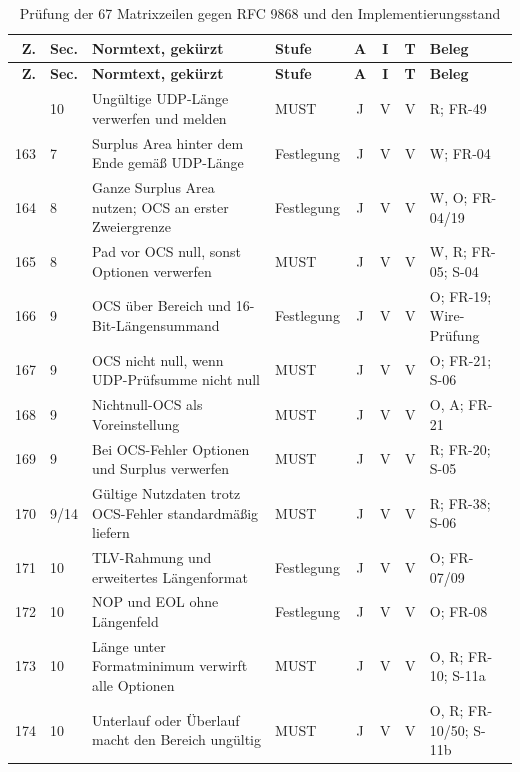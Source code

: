 \begingroup
\footnotesize
\setlength{\tabcolsep}{2pt}
\renewcommand{\arraystretch}{1.00}
\begin{longtable}{@{}r l L{4.45cm} L{2.00cm} c c c L{4.20cm}@{}}
\caption{Prüfung der 67 Matrixzeilen gegen RFC 9868 und den Implementierungsstand}
\label{tab:eval-sollist}\\
\toprule
\textbf{Z.} & \textbf{Sec.} & \textbf{Normtext, gekürzt} & \textbf{Stufe} & \textbf{A} &
\textbf{I} & \textbf{T} & \textbf{Beleg} \\
\midrule
\endfirsthead
\toprule
\textbf{Z.} & \textbf{Sec.} & \textbf{Normtext, gekürzt} & \textbf{Stufe} & \textbf{A} &
\textbf{I} & \textbf{T} & \textbf{Beleg} \\
\midrule
\endhead
\bottomrule
{} & 10 & Ungültige UDP-Länge verwerfen und melden & MUST & J & V & V & R; FR-49 \\
163 & 7 & Surplus Area hinter dem Ende gemäß UDP-Länge & Festlegung & J & V & V & W; FR-04 \\
164 & 8 & Ganze Surplus Area nutzen; OCS an erster Zweiergrenze & Festlegung & J & V & V & W, O; FR-04/19 \\
165 & 8 & Pad vor OCS null, sonst Optionen verwerfen & MUST & J & V & V & W, R; FR-05; S-04 \\
166 & 9 & OCS über Bereich und 16-Bit-Längensummand & Festlegung & J & V & V & O; FR-19; Wire-Prüfung \\
167 & 9 & OCS nicht null, wenn UDP-Prüfsumme nicht null & MUST & J & V & V & O; FR-21; S-06 \\
168 & 9 & Nichtnull-OCS als Voreinstellung & MUST & J & V & V & O, A; FR-21 \\
169 & 9 & Bei OCS-Fehler Optionen und Surplus verwerfen & MUST & J & V & V & R; FR-20; S-05 \\
170 & 9/14 & Gültige Nutzdaten trotz OCS-Fehler standardmäßig liefern & MUST & J & V & V & R; FR-38; S-06 \\
171 & 10 & TLV-Rahmung und erweitertes Längenformat & Festlegung & J & V & V & O; FR-07/09 \\
172 & 10 & NOP und EOL ohne Längenfeld & Festlegung & J & V & V & O; FR-08 \\
173 & 10 & Länge unter Formatminimum verwirft alle Optionen & MUST & J & V & V & O, R; FR-10; S-11a \\
174 & 10 & Unterlauf oder Überlauf macht den Bereich ungültig & MUST & J & V & V & O, R; FR-10/50; S-11b \\

\end{longtable}
